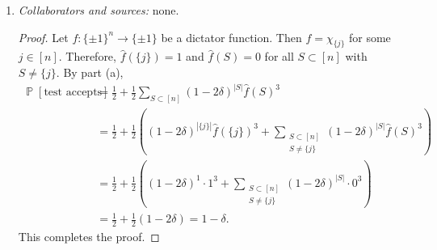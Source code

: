 \documentclass[letterpaper, reqno,11pt]{article}
\newcommand{\PP}{\mathop{{}\mathbb{P}}}
\newcommand{\EE}{\mathop{{}\mathbb{E}}}
\begin{document}
\begin{enumerate}
\begin{enumerate}
\begin{proof}
\begin{align*}
        &= \frac{1}{2^n} \sum_{\text{pairs $\left(x, x^{\oplus j}\right)$}} \left(x_j \prod_{i \in (S \triangle U) \setminus \{ j \}} x_i + \left(-x_j\right) \prod_{i \in (S \triangle U) \setminus \{ j \}} x_i\right) = 0.
      \end{align*}
      Since $x$, $y$ and $w$ are chosen independently, then for all $S, T, U \subset [n]$ such that either $S \neq U$ or $T \neq U$,
      $$ \EE\left[\chi_{S \triangle U}(x) \chi_{T \triangle U}(y) \chi_U(w)\right] = \EE\left[\chi_{S \triangle U}(x)\right] \EE\left[\chi_{T \triangle U}(y)\right] \EE\left[\chi_U(w)\right] = 0. $$
      Therefore,
      \begin{align*}
        \PP[\text{test accepts}] &= \EE\left[\mathds 1_\text{test accepts}\right] = \EE\left[\frac{1 + f(x)f(y)f(z)}{2}\right] = \frac{1}{2} + \frac{1}{2} \EE[f(x)f(y)f(z)] \\
        &= \frac{1}{2} + \frac{1}{2} \sum_{S, T, U \subset [n]} \hat{f}(S) \hat{f}(T) \hat{f}(U) \EE\left[\chi_{S \triangle U}(x) \chi_{T \triangle U}(y) \chi_U(w)\right] \\
        &= \frac{1}{2} + \frac{1}{2} \sum_{S \subset [n]} (1 - 2\delta)^{|S|} \hat{f}(S)^3.
      \end{align*}
      This completes the proof.
    \end{proof}

    \clearpage

    \item \noindent\emph{Collaborators and sources:} none.
    
    \begin{proof}
      Let $f : \{ \pm 1 \}^n \to \{ \pm 1 \}$ be a dictator function. Then $f = \chi_{\{ j \}}$ for some $j \in [n]$. Therefore, $\hat{f}(\{ j \}) = 1$ and $\hat{f}(S) = 0$ for all $S \subset [n]$ with $S \neq \{ j \}$. By part (a),
      \begin{align*}
        \PP[\text{test accepts}] &= \frac{1}{2} + \frac{1}{2} \sum_{S \subset [n]} (1 - 2\delta)^{|S|} \hat{f}(S)^3 \\
        &= \frac{1}{2} + \frac{1}{2} \left((1 - 2\delta)^{|\{ j \}|} \hat{f}(\{ j \})^3 + \sum_{\substack{S \subset [n] \\ S \neq \{ j \}}} (1 - 2\delta)^{|S|} \hat{f}(S)^3\right) \\
        &= \frac{1}{2} + \frac{1}{2} \left((1 - 2\delta)^1 \cdot 1^3 + \sum_{\substack{S \subset [n] \\ S \neq \{ j \}}} (1 - 2\delta)^{|S|} \cdot 0^3\right) \\
        &= \frac{1}{2} + \frac{1}{2} (1 - 2\delta) = 1 - \delta.
      \end{align*}
      This completes the proof.
    \end{proof}


\end{enumerate}
\end{enumerate}
\end{document}
